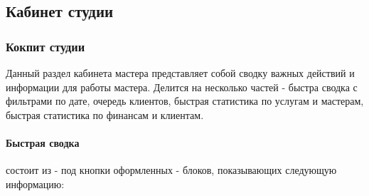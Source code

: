 \documentclass[DIV=calc, paper=a4, fontsize=11pt]{scrartcl} %
\begin{document}
\subsection{Кабинет студии}

\subsubsection{Кокпит студии}
Данный раздел кабинета мастера представляет собой сводку важных действий и информации для работы мастера. Делится на несколько частей - быстра сводка с фильтрами по дате, очередь клиентов, быстрая статистика по услугам и мастерам, быстрая статистика по финансам и клиентам.

\paragraph{Быстрая сводка} 
состоит из - под кнопки оформленных - блоков, показывающих следующую информацию:
\end{document}
